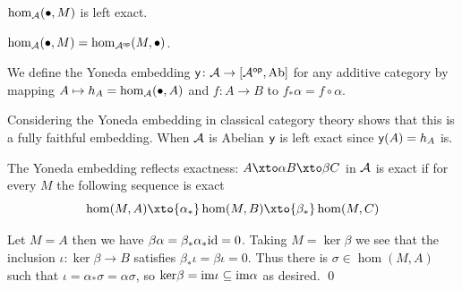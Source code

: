 \eproof

\bcoro

    $\hom_{{\cal A}}(\bullet,M)$ is left exact.

\ecoro

\bproof

    $\hom_{{\cal A}}(\bullet,M)=\hom_{{{\cal A}}^{\sf op}}(M,\bullet)$.

\eproof

\bdefn

    We define the {\emphcolor Yoneda embedding} ${\sf y}\colon{{\cal A}}\to[{{\cal A}}^{\sf op},{\rm Ab}]$ for any additive category by mapping $A\mapsto h_A=\hom_{{\cal A}}(\bullet,A)$ and $f\colon A\to B$ to $f_*\alpha=f\circ\alpha$.

\edefn

Considering the Yoneda embedding in classical category theory shows that this is a fully faithful embedding.
When ${{\cal A}}$ is Abelian ${\sf y}$ is left exact since ${\sf y}(A)=h_A$ is.

\blemm[title=Yoneda]

    The Yoneda embedding reflects exactness: $A\xto\alpha B\xto\beta C$ in ${{\cal A}}$ is exact if for every $M$ the following sequence is exact
    $$ \hom(M,A) \xto{\alpha_*} \hom(M,B) \xto{\beta_*} \hom(M,C) $$

\elemm

\bproof

    Let $M=A$ then we have $\beta\alpha=\beta_*\alpha_*{\rm id}=0$.
    Taking $M=\ker\beta$ we see that the inclusion $\iota\colon\ker\beta\to B$ satisfies $\beta_*\iota=\beta\iota=0$.
    Thus there is $\sigma\in\hom(M,A)$ such that $\iota=\alpha_*\sigma=\alpha\sigma$, so ${\rm ker}\beta={\rm im}\iota\subseteq{\rm im}\alpha$ as desired.
    \qed

\eproof

